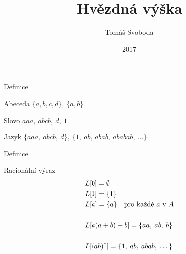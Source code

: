 \documentclass{beamer}
\title[Hvězdná výška]{Hvězdná výška}
\author[Tomáš Svoboda]{Tomáš Svoboda}
\institute{Katedra algebry}
\date{2017}
\begin{document}

\begin{frame}
\titlepage
\end{frame}

\begin{frame}{Definice}
      \begin{exampleblock}{Abeceda}
            \centering
            $\{ a, b, c, d \}, \: \{a, b\}$
      \end{exampleblock}

      \pause

      \begin{exampleblock}{Slovo}
            \centering
            $aaa, \: abcb, \: d, \: 1$
      \end{exampleblock}

      \pause

      \begin{exampleblock}{Jazyk}
            \centering
            $\{ aaa, \: abcb, \: d \}, \: \{ 1, \: ab, \: abab, \: ababab, \: \dots \}$
      \end{exampleblock}
\end{frame}

\begin{frame}{Definice}
      \begin{exampleblock}{Racionální výraz}
            \vspace{-5mm}%
            \begin{align*}
                  &L[{\mathsf{0}}] = \emptyset \\
                  &L[{\mathsf{1}}] = \{1\} \\
                  &L[a] = \{a\} \quad \text{pro každé $a$ v $A$} \\
                  \\
                  &L[a(a+b) + b] = \{aa, \: ab, \: b\} \\
                  \\
                  &L[{(ab)}^*] = \{{\mathsf{1}}, \: ab, \: abab , \: \dots \}
            \end{align*}
      \end{exampleblock}
\end{frame}
\end{document}
